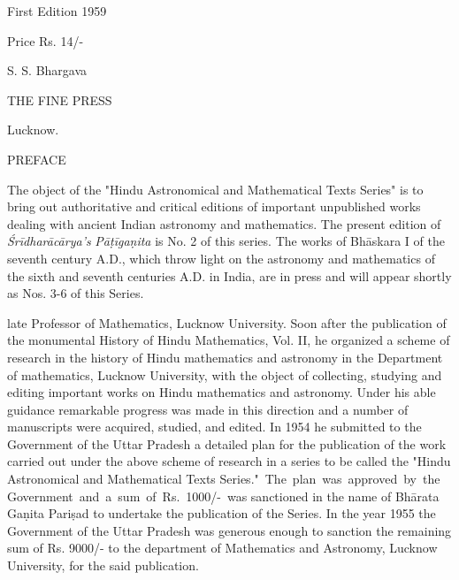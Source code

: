 \documentclass[10pt, openany]{book}
\begin{document}
\newpage

\thispagestyle{empty}


 First Edition 1959

\vspace{5cm} {Price Rs. 14/-}



\vspace{8cm}

\hspace{0.4cm} {S. S. Bhargava}

{THE FINE PRESS}

\hspace{0.7cm} {Lucknow.}

\newpage

\thispagestyle{empty}

\begin{center}{\large PREFACE}\end{center}

{The object of the "Hindu Astronomical and Mathematical Texts}
{Series" is to bring out authoritative and critical editions of
important}
{unpublished works dealing with ancient Indian astronomy and mathematics. The present edition of} {\textit{Śrīdharācārya'{s}}} {\textit{Pāṭīgaṇita}} {is No. 2 of
this series.}
{The works of Bhāskara I of the seventh century A.D., which throw light}
{on the astronomy and mathematics of the sixth and seventh centuries}
{A.D. in India, are in press and will appear shortly as Nos. }{3-6 of}
{this Series.}

\vspace{0.3cm}{The idea of bringing out the above series is due to Dr. A.\,N. Singh,}
{late Professor of Mathematics, Lucknow University. Soon after the}
{publication of the monumental History of Hindu Mathematics, Vol. II,}
{he organized a scheme of research in the history of Hindu mathematics}
{and astronomy in the Department of mathematics, Lucknow University,}
{with the object of collecting, studying and editing important works on}
{Hindu mathematics and astronomy. Under his able guidance remarkable}
{progress was made in this direction and a number of manuscripts were}
{acquired, studied, and edited. In 1954 he submitted to the Government}
{of the Uttar Pradesh a detailed plan for the publication of the work}
{carried out under the above scheme of research in a series to be
called}
{the "Hindu Astronomical and Mathematical Texts Series." \,The \,plan \,was \,approved \,by \,the \,Government \,and \,a \,sum \,of \,Rs. \,1000/- \,was sanctioned}
{in the name of Bhārata Gaṇita Pariṣad to undertake the publication}
{of the Series. In the year 1955 the Government of the Uttar Pradesh}
{was generous enough to sanction the remaining sum of Rs. }{9000/- to the}
{department of Mathematics and Astronomy, Lucknow University, for the}
{said publication.}
\end{document}
